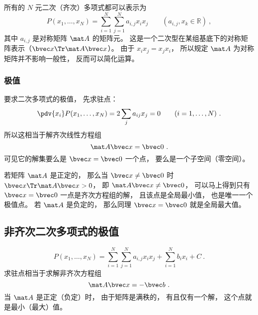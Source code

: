 

所有的 $N$ 元二次（齐次）多项式都可以表示为
\begin{equation}
P(x_1,\dots,x_N) = \sum_{i=1}^N\sum_{j=1}^N a_{i,j}x_i x_j \qquad (a_{i,j}, x_k \in \mathbb R)~,
\end{equation}
其中 $a_{i,j}$ 是对称矩阵 $\mat A$ 的矩阵元。 这是一个二次型在某组基底下的对称矩阵表示（$\bvec x\Tr \mat A \bvec x$）。 由于 $x_i x_j = x_j x_i$， 所以规定 $\mat A$ 为对称矩阵并不影响一般性， 反而可以简化运算。

\subsubsection{极值}
要求二次多项式的极值， 先求驻点：
\begin{equation}
\pdv{x_i}P(x_1,\dots,x_N) = 2\sum_j a_{ij} x_j = 0 \qquad (i = 1,\dots,N)~.
\end{equation}
所以这相当于解齐次线性方程组
\begin{equation}
\mat A \bvec x = \bvec 0~.
\end{equation}
可见它的解集要么是 $\bvec x = \bvec 0$ 一个点， 要么是一个子空间（零空间）。

若矩阵 $\mat A$ 是正定的， 那么当 $\bvec x \ne \bvec 0$ 时 $\bvec x\Tr \mat A \bvec x > 0$， 即 $\mat A \bvec x \ne \bvec 0$， 可以马上得到只有 $\bvec x = \bvec 0$ 一点是齐次方程组的解， 且该点是全局最小值， 也是唯一一个极值点。 若 $\mat A$ 是负定的， 那么同理 $\bvec x = \bvec 0$ 就是全局最大值。

\subsection{非齐次二次多项式的极值}
\begin{equation}
P(x_1,\dots,x_N) = \sum_{i=1}^N\sum_{j=1}^N a_{i,j}x_i x_j + \sum_{i=1}^N b_i x_i + C~.
\end{equation}
求驻点相当于求解非齐次方程组
\begin{equation}
\mat A \bvec x = -\bvec b~.
\end{equation}
当 $\mat A$ 是正定（负定）时， 由于矩阵是满秩的， 有且仅有一个解， 这个点就是最小（最大）值。
